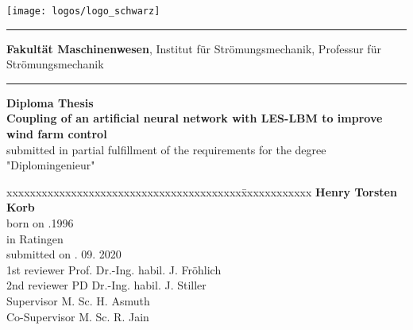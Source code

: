 \begin{titlepage}
\addtolength{\topmargin}{-1.5cm}
\hspace{-2.1cm} \texttt{[image: logos/logo\_schwarz]}
\vspace{0.5cm}
\hrule 
\vspace{0.05cm}
\small\textbf{Fakultät Maschinenwesen},
Institut für Strömungsmechanik,
Professur für Strömungsmechanik
\vspace{0.1cm}
\hrule 
\vspace{4cm}
\textbf{\Large Diploma Thesis}\\

\vspace{1.5cm}
%
\textbf{\LARGE Coupling of an artificial neural network with LES-LBM to improve wind farm control}\\[1.5cm]
%
\normalsize
submitted in partial fulfillment of the requirements for the degree "Diplomingenieur"\\[2.5cm]
\begin{tabbing}
	xxxxxxxxxxxxxxxxxxxxxxxxxxxxxxxxxxxxxxxx\=xxxxxxxxxxxx\kill
					\>  \textbf{Henry Torsten Korb}\\
	born on			.1996\\
	in				\>	Ratingen \\[0.1cm]
	submitted on	. 09. 2020 \\[0.5cm]
	1st reviewer	\>  Prof. Dr.-Ing. habil. J. Fröhlich	\\
	2nd reviewer	\>	PD Dr.-Ing. habil. J. Stiller \\
	Supervisor		\>  M. Sc. H. Asmuth \\
	Co-Supervisor	\>  M. Sc. R. Jain 
\end{tabbing}
\cleardoublepage
\end{titlepage}